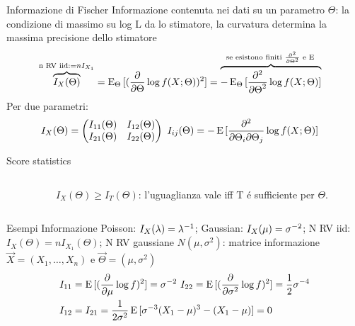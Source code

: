 \documentclass[asd-beamer.tex]{subfiles}
\begin{document}
\begin{frame}{Informazione di Fischer}
	Informazione contenuta nei dati su un parametro $\Theta$: la condizione di massimo su log L da lo stimatore, la curvatura determina la massima precisione dello stimatore
	\begin{align*}
	&\overbrace{I_X(\Theta)}^{\text{n RV iid:}=nI_{X_1}}=\operatorname{E}_{\Theta}{[(\frac{\partial}{\partial \Theta}\log{f(X;\Theta}))^2]}=\overbrace{-\operatorname{E}_{\Theta}{[\frac{\partial^2}{{\partial \Theta}^2}\log{f(X;\Theta)}]}}^{\text{se esistono finiti $\frac{\partial^2}{{\partial \Theta}^2}$ e $\operatorname{E}{}$}}
	\end{align*}
	Per due parametri:
	\begin{align*}
	&I_X(\Theta)=\begin{pmatrix}I_{11}(\Theta)&I_{12}(\Theta)\\I_{21}(\Theta)&I_{22}(\Theta)\end{pmatrix}\ I_{ij}(\Theta)=-\E{[\frac{\partial^2}{\partial\Theta_i\partial\Theta_j}\log{f(X;\Theta)}]}
	\end{align*}
	\begin{block}{Score statistics}
		\begin{columns}[T]\begin{column}{0.5\textwidth}
				
			\end{column}\begin{column}{0.5\textwidth}
				$I_X(\Theta)\geq I_T(\Theta)$: l'uguaglianza vale iff T \'e sufficiente per $\Theta$.
		\end{column}\end{columns}
	\end{block}
\end{frame}

\begin{wordonframe}{Esempi Informazione}
	Poisson: $I_X(\lambda)={\lambda}^{-1}$;
	Gaussian: $I_X(\mu)=\sigma^{-2}$;
	N RV iid: $I_X(\Theta)=nI_{X_1}(\Theta)$;
	N RV gaussiane $N(\mu,\sigma^2)$: matrice informazione
	$\vec{X}=(X_1,\ldots,X_n)$ e $\vec{\Theta}=(\mu,\sigma^2)$
	\begin{align*}
	&I_{11}=\E{[(\PDof{\mu}\log{f})^2]}=\sigma\expy{-2}\ I_{22}=\E{[(\PDof{\sigma^2}\log{f})^2]}=\frac{1}{2}\sigma\expy{-4}\\
	&I_{12}=I_{21}=\frac{1}{2\sigma^2}\E{[\sigma\expy{-3}(X_1-\mu)^3-(X_1-\mu)]}=0
	\end{align*}
\end{wordonframe}
\end{document}
